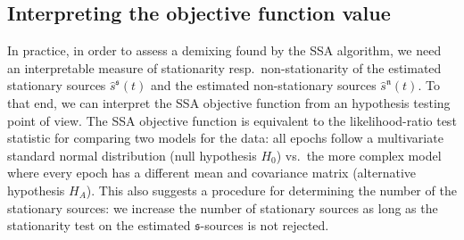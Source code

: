 \documentclass{article}
\newcommand{\1}{\ensuremath{\mathds{1}}}
\newcommand{\s}{\ensuremath{\mathfrak{s}}}
\newcommand{\n}{\ensuremath{\mathfrak{n}}}
\newcommand{\0}{\ensuremath{0}}
\begin{document}
\begin{appendices}

\section{Interpreting the objective function value}
\label{app:objfunval}

\newcommand{\emu}{\hat{\mu}}
\newcommand{\esi}{\hat{\Sigma}}

In practice, in order to assess a demixing found by the SSA algorithm, we need an interpretable 
measure of  stationarity resp.~non-stationarity of the estimated stationary sources $\hat{s}^\s(t)$
and the estimated non-stationary sources $\hat{s}^\n(t)$. To that end, we can interpret 
the SSA objective function from an hypothesis testing point of view. The SSA objective function 
is equivalent to the likelihood-ratio test statistic for comparing two models for the data: 
all epochs follow a multivariate standard normal distribution (null hypothesis $H_0$) vs.~the 
more complex model where every epoch has a different mean and covariance matrix 
(alternative hypothesis $H_A$). This also suggests a procedure for determining the number of 
the stationary sources: we increase the number of stationary sources as long as the stationarity 
test on the estimated \s-sources is not rejected.


\end{appendices}
\end{document}
